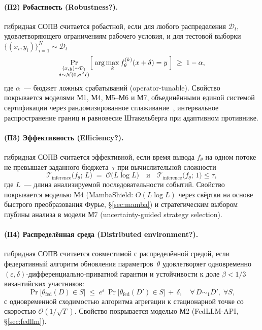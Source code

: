 \paragraph{(П2) Робастность (Robustness?).}
гибридная СОПВ считается робастной, если для любого распределения
$\mathcal{D}_t$, удовлетворяющего ограничениям рабочего условия, и для
тестовой выборки $\{(x_i,y_i)\}_{i=1}^{N}\sim\mathcal{D}_t$
\begin{equation}
\Pr_{\substack{(x,y)\sim\mathcal{D}_t \\ \delta\sim\mathcal{N}(0,\sigma^2 I)}}
\Bigl[\;\arg\max_k f_\theta^{(k)}(x+\delta) = y\;\Bigr]
\;\ge\; 1-\alpha,
\label{eq:robustness_property}
\end{equation}
где $\alpha$~--- бюджет ложных срабатываний (operator-tunable).
Свойство покрывается моделями М1, М4, М5--М6 и М7, объединёнными
единой системой сертификации через рандомизированное
сглаживание~\cite{Cohen2019}, интервальное распространение границ и
равновесие Штакельберга при адаптивном противнике.

\paragraph{(П3) Эффективность (Efficiency?).}
гибридная СОПВ считается эффективной, если время вывода $f_\theta$ на
одном потоке не превышает заданного бюджета~$\tau$ при
вычислительной сложности
\begin{equation}
\mathcal{T}_{\mathrm{inference}}\bigl(f_\theta;\,L\bigr)
\;=\; \mathcal{O}\bigl(L\log L\bigr)
\quad\text{и}\quad
\mathcal{T}_{\mathrm{inference}}\bigl(f_\theta;\,1\bigr) \le \tau,
\label{eq:efficiency_property}
\end{equation}
где $L$~--- длина анализируемой последовательности событий. Свойство
покрывается моделью М4 (\textsf{MambaShield}: $O(L\log L)$ через
свёртки на основе быстрого преобразования Фурье, \S\ref{sec:mamba})
и стратегическим выбором глубины анализа в модели М7
(uncertainty-guided strategy selection).

\paragraph{(П4) Распределённая среда (Distributed environment?).}
гибридная СОПВ считается совместимой с распределённой средой, если
федеративный алгоритм обновления параметров~$\theta$ удовлетворяет
одновременно $(\varepsilon,\delta)$-дифференциально-приватной гарантии
и устойчивости к доле $\beta<1/3$ византийских участников:
\begin{equation}
\Pr\bigl[\theta_{\mathrm{fed}}(D)\in S\bigr] \;\le\;
e^{\varepsilon}\,\Pr\bigl[\theta_{\mathrm{fed}}(D')\in S\bigr]
\,+\,\delta,
\quad
\forall\,D\sim_{1}D',\;\forall S,
\label{eq:distributed_property}
\end{equation}
с одновременной сходимостью алгоритма агрегации к стационарной точке
со скоростью $\mathcal{O}(1/\sqrt{T})$. Свойство покрывается
моделью М2 (\textsf{FedLLM-API}, \S\ref{sec:fedllm}).

